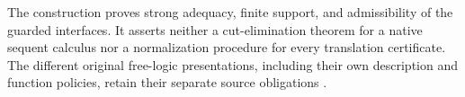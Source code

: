 The construction proves strong adequacy, finite support, and admissibility
of the guarded interfaces.  It asserts neither a cut-elimination theorem
for a native sequent calculus nor a normalization procedure for every
translation certificate.  The different original free-logic presentations,
including their own description and function policies, retain their separate
source obligations \cite{Lambert1967,Bencivenga1986,Lehmann2002}.

